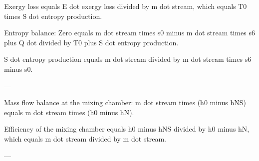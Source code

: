 Exergy loss equals E dot exergy loss divided by m dot stream, which equals T0 times S dot entropy production.  

Entropy balance:  
Zero equals m dot stream times s0 minus m dot stream times s6 plus Q dot divided by T0 plus S dot entropy production.  

S dot entropy production equals m dot stream divided by m dot stream times s6 minus s0.  

---

Mass flow balance at the mixing chamber:  
m dot stream times (h0 minus hNS) equals m dot stream times (h0 minus hN).  

Efficiency of the mixing chamber equals h0 minus hNS divided by h0 minus hN, which equals m dot stream divided by m dot stream.  

---